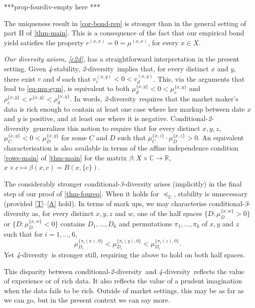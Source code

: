 \documentclass[ecta,nameyear,draft]{econsocart}
\newcommand{\R}{\mathbb R}
\newcommand{\mbbd}{{\mathds D}}
\newcommand{\mbbc}{{\mathds C}}
\newcommand{\xx}{(x,x)}
\newcommand{\xy}{{(x, y)}}
\newcommand{\stability}{\textit{4}-\textup{{stability}}}
\newcommand{\condtwodiv}{\textup{conditional-\textit{2}-diversity}}
\newcommand{\Condtwodiv}{\textup{Conditional-\textit{2}-diversity}}
\newcommand{\twodiv}{\textit{2}-\textup{diversity}}
\newcommand{\fourdiv}{\textit{4}-\textup{diversity}}
\theoremstyle{plain}
\theoremstyle{remark}
\begin{document}
***prop-fourdiv-empty here ***

The uniqueness result in \cref{cor-bond-rep} is stronger than in the general
setting of part II of \cref{thm-main}. This is a consequence of the fact that
our empirical bond yield satisfies the property $r^{\xx} = 0 = \mu^{\xx}$, for
every $x \in X$. 

\emph{Our diversity axiom, \ref{c2d},} has a straightforward
interpretation in the present setting. Given \stability, \twodiv\ implies that,
for every distinct $x$ and $y$, there exist $c$ and $d$ such that $v^{\xy}_{c}
< 0 < v^{\xy}_{d}$.  This, via the arguments that lead to \cref{eq-mu-sym}, is
equivalent to both $\mu^{\{x,y\}}_{d} < 0 < \mu^{\{x,y\}}_{c}$ and
$\rho^{\{x,y\}}_{c} < r^{\{x,y\}} < \rho^{\{x,y\}}_{d}$.  In words, \twodiv\
requires that the market maker's data is rich enough to contain at least one
case where her markup between date $x$ and $y$ is positive, and at least one
where it is negative.
\Condtwodiv\ {generalizes} this notion to require that for every distinct $x,
y, z$, $\mu^{\{x,y\}}_{C} < 0 < \mu^{\{x,y\}}_{D}$ for some $C$ and $D$ such
that $\mu^{\{x,z\}}_{C}\cdot \mu^{\{x,z\}}_{D} >0$. An equivalent
characterisation is also available in terms of the affine independence
condition \ref{rows-main} of \cref{thm-main} for the matrix $\beta: X \times
\mbbc \rightarrow \R$, $x\times c \mapsto \beta(x, c) = B(x, \{c\})$.

The considerably stronger conditional-\emph{3}-diversity arises (implicitly) in
the final step of our proof of \cref{thm-foureq}. When it holds for
$\preceq_{\mbbd}$, {stability} is unnecessary (provided \ref{T}--\ref{A} hold).
In terms of mark ups, we may characterise conditional-\emph{3}-diversity as,
for every distinct $x, y, z$ and $w$, one of the half spaces $\{D :
\mu^{\{x,w\}}_D > 0\}$ or $\{D: \mu^{\{x,w\}}_D < 0\}$ contains $D_1, \dots,
D_6$ and permutations $\pi_1, \dots, \pi_6$ of $x, y$ and $z$ such that for
$i=1,\dots,6$, 
\begin{equation*}
  \mu^{\{\pi_i(x),0\}}_{D_i} < \mu^{\{\pi_i(y),0\}}_{D_i} <
  \mu^{\{\pi_i(z),0\}}_{D_i}.
\end{equation*}
Yet \fourdiv\ is stronger still, requiring the above to hold on both half
spaces.

This disparity between \condtwodiv\ and \fourdiv\ reflects the value of
experience or of rich data. It also reflects the value of a prudent imagination
when the data fails to be rich.  Outside of market settings, this may be as far
as we can go, but in the present context we can say more.
\end{document}
